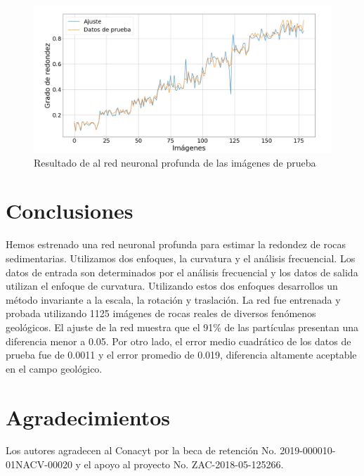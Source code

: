 \documentclass[conference]{IEEEtran}
\begin{document}
\begin{figure}[htbp]
\centerline{\includegraphics[scale=0.3]{fig8.png}}
\caption{Resultado de al red neuronal profunda de las imágenes de prueba}
\label{fig8}
\end{figure}

\section{Conclusiones}
Hemos estrenado una red neuronal profunda para estimar la redondez de rocas sedimentarias. Utilizamos dos enfoques, la curvatura y el análisis frecuencial. Los datos de entrada son determinados por el análisis frecuencial y los datos de salida utilizan el enfoque de curvatura. Utilizando estos dos enfoques desarrollos un método invariante a la escala, la rotación y traslación. La red fue entrenada y probada utilizando 1125 imágenes de rocas reales de diversos fenómenos geológicos. El ajuste de la red muestra que el 91\% de las partículas presentan una diferencia menor a 0.05. Por otro lado, el error medio cuadrático de los datos de prueba fue de 0.0011 y el error promedio de 0.019, diferencia altamente aceptable en el campo geológico.  

\section*{Agradecimientos}

Los autores agradecen al Conacyt por la beca de retención No. 2019-000010-01NACV-00020 y el apoyo al proyecto No. ZAC-2018-05-125266. 
\end{document}
